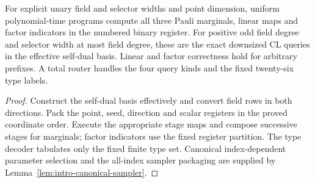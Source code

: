 \begin{lemma}
\label{lem:intro-executable-pauli-queries}
\leanok
For explicit unary field and selector widths and point dimension, uniform
polynomial-time programs compute all three Pauli marginals, linear maps and
factor indicators in the numbered binary register. For positive odd field
degree and selector width at most field degree, these are the exact downsized
CL queries in the effective self-dual basis. Linear and factor correctness
hold for arbitrary prefixes. A total router handles the four query kinds
and the fixed twenty-six type labels.
\end{lemma}
\begin{proof}
\leanok
Construct the self-dual basis effectively and convert field rows in both
directions. Pack the point, seed, direction and scalar registers in the
proved coordinate order. Execute the appropriate stage maps and compose
successive stages for marginals; factor indicators use the fixed register
partition. The type decoder tabulates only the fixed finite type set.
Canonical index-dependent parameter selection and the all-index sampler
packaging are supplied by Lemma~\ref{lem:intro-canonical-sampler}.
\end{proof}

